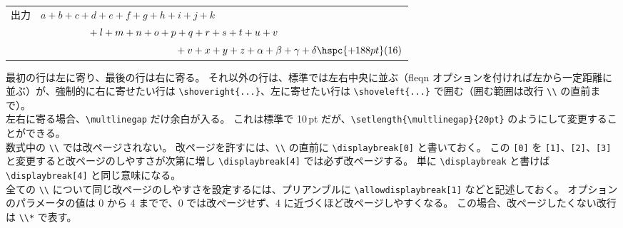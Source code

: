 \begin{longtable}[l]{@{}l|l@{}}
  出力 & $a + b + c + d + e + f + g + h + i + j + k$                                                                              \\
  \    & $\hphantom{a + b + c +}+ l + m + n + o + p + q + r + s + t + u + v$                                                      \\
  \    & $\hphantom{a + b + c + d + e + f + g + h +}+ v + x + y + z + \alpha + \beta + \gamma + \delta \hspc{+188pt} \text{(16)}$ \\
\end{longtable}
最初の行は左に寄り、最後の行は右に寄る。
それ以外の行は、標準では左右中央に並ぶ（fleqn オプションを付ければ左から一定距離に並ぶ）が、強制的に右に寄せたい行は \verb`\shoveright{...}`、左に寄せたい行は \verb`\shoveleft{...}` で囲む（囲む範囲は改行 \verb`\\` の直前まで）。\\

左右に寄る場合、\verb`\multlinegap` だけ余白が入る。
これは標準で 10\,pt だが、\verb`\setlength{\multlinegap}{20pt}` のようにして変更することができる。\\

数式中の \verb`\\` では改ページされない。
改ページを許すには、\verb`\\` の直前に \verb`\displaybreak[0]` と書いておく。
この \verb`[0]` を \verb`[1]`、\verb`[2]`、\verb`[3]` と変更すると改ページのしやすさが次第に増し \verb`\displaybreak[4]` では必ず改ページする。
単に \verb`\displaybreak` と書けば \verb`\displaybreak[4]` と同じ意味になる。\\

全ての \verb`\\` について同じ改ページのしやすさを設定するには、プリアンブルに \verb`\allowdisplaybreak[1]` などと記述しておく。
オプションのパラメータの値は 0 から 4 までで、0 では改ページせず、4 に近づくほど改ページしやすくなる。
この場合、改ページしたくない改行は \verb`\\*` で表す。\\

